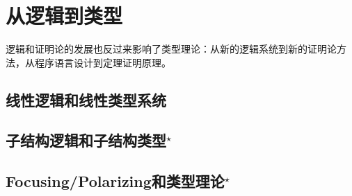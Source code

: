 \section{从逻辑到类型}

逻辑和证明论的发展也反过来影响了类型理论：从新的逻辑系统到新的证明论方法，从程序语言设计到定理证明原理。

\subsection{线性逻辑和线性类型系统}


\subsection{子结构逻辑和子结构类型${}^{\star}$}


\subsection{Focusing/Polarizing和类型理论${}^{\star}$}
